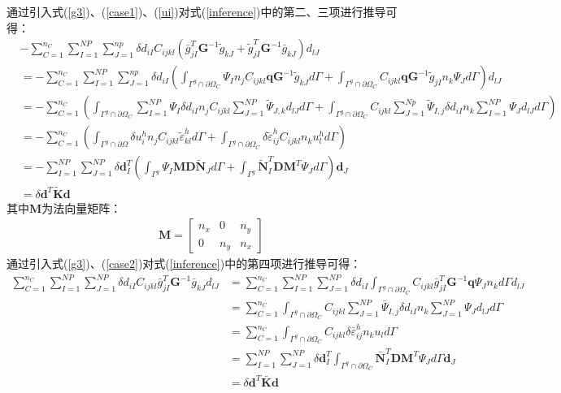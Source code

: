 通过引入式(\ref{g3})、(\ref{case1})、(\ref{ui})对式(\ref{inference})中的第二、三项进行推导可得：
\begin{equation}
\begin{split}
    &-\sum_{C=1}^{n_C}\sum_{I=1}^{N\!P}\sum_{J=1}^{n\!p}\delta d_{iI}C_{ijkl}(\bar{g}_{jI}^T\pmb{G}^{-1}\tilde{g}_{kJ}+\tilde{g}_{jI}^T\pmb{G}^{-1}\bar{g}_{kJ})d_{lJ}\\
    &=-\sum_{C=1}^{n_C}\sum_{I=1}^{N\!P}\sum_{J=1}^{n\!p}\delta d_{iI}(\int_{\Gamma^g\cap\partial\Omega_C}\Psi_In_jC_{ijkl}\pmb{q}\pmb{G}^{-1}\tilde{g}_{kJ}d\Gamma+\int_{\Gamma^g\cap\partial\Omega_C}C_{ijkl}\pmb{q}\pmb{G}^{-1}\tilde{g}_{jI}n_k\Psi_Jd\Gamma)d_{lJ}\\
    &=-\sum_{C=1}^{n_C}(\int_{\Gamma^g\cap\partial\Omega_C}\sum_{I=1}^{N\!P}\Psi_I\delta d_{iI}n_jC_{ijkl}\sum_{J=1}^{N\!P}\tilde{\Psi}_{J,k}d_{lJ}d\Gamma+\int_{\Gamma^g\cap\partial\Omega_C}C_{ijkl}\sum_{J=1}^{N\!p}\tilde{\Psi}_{I,j}\delta d_{iI}n_k\sum_{I=1}^{N\!P}\Psi_Jd_{lJ}d\Gamma)\\
    &=-\sum_{C=1}^{n_C}(\int_{\Gamma^g\cap\partial\Omega}\delta u_i^hn_jC_{ijkl}\tilde{\varepsilon}_{kl}^hd\Gamma+\int_{\Gamma^g\cap\partial\Omega_C}\delta\tilde{\varepsilon}_{ij}^hC_{ijkl}n_ku^h_ld\Gamma)\\
    &=-\sum_{I=1}^{N\!P}\sum_{J=1}^{N\!P}\delta\pmb{d}_I^T(\int_{\Gamma^g}\Psi_I\pmb{M}\pmb{D}\tilde{\pmb{N}}_Jd\Gamma+\int_{\Gamma^g}\tilde{\pmb{N}}_I^T\pmb{D}\pmb{M}^T\Psi_Jd\Gamma)\pmb d_J\\
    &=\delta\pmb{d}^T\tilde{\pmb{K}}\pmb{d}
\end{split}
\end{equation}
其中$\pmb{M}$为法向量矩阵：
\begin{equation}
\begin{split}
    \pmb{M}=\left[\begin{matrix}n_x&0&n_y\\0&n_y&n_x
    \end{matrix}\right] 
\end{split}
\end{equation}
通过引入式(\ref{g3})、(\ref{case2})对式(\ref{inference})中的第四项进行推导可得：
\begin{equation}
\begin{split}
    \sum_{C=1}^{n_C}\sum_{I=1}^{N\!P}\sum_{J=1}^{N\!P}\delta d_{iI}C_{ijkl}\bar{g}^T_{jI}\pmb{G}^{-1}\bar{g}_{kJ}d_{lJ}
    &=\sum_{C=1}^{n_C}\sum_{I=1}^{N\!P}\sum_{J=1}^{N\!P}\delta d_{iI}\int_{\Gamma^g\cap\partial\Omega_C}C_{ijkl}\bar{g}_{jI}^T\pmb{G}^{-1}\pmb{q}\Psi_Jn_kd\Gamma d_{lJ}\\
    &=\sum_{C=1}^{n_C}\int_{\Gamma^g\cap\partial\Omega_C}C_{ijkl}\sum_{J=1}^{N\!P}\bar{\Psi}_{I,j}\delta d_{iI}n_k\sum_{J=1}^{N\!P}\Psi_{J}d_{lJ}d\Gamma\\
    &=\sum_{C=1}^{n_C}\int_{\Gamma^g\cap\partial\Omega_C}C_{ijkl}\delta\bar{\varepsilon}_{ij}^hn_ku_ld\Gamma\\
    &=\sum_{I=1}^{N\!P}\sum_{J=1}^{N\!P}\delta\pmb{d}_I^T\int_{\Gamma^g\cap\partial\Omega_C}\bar{\pmb{N}}_I^T\pmb{D}\pmb{M}^T\Psi_Jd\Gamma\pmb{d}_J\\
    &=\delta\pmb{d}^T\bar{\pmb{K}}\pmb{d}
\end{split}
\end{equation}
